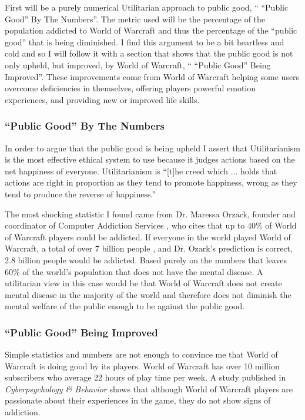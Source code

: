 \documentclass[11pt]{article}
\begin{document}
\begin{multicols}{2}
First will be a purely numerical Utilitarian approach to public good, `` ``Public Good'' By The Numbers''. The metric used will be the percentage of the population addicted to World of Warcraft and thus the percentage of the ``public good'' that is being diminished. I find this argument to be a bit heartless and cold and so I will follow it with a section that shows that the public good is not only upheld, but improved, by World of Warcraft, `` ``Public Good'' Being Improved''. These improvements come from World of Warcraft helping some users overcome deficiencies in themselves, offering players powerful emotion experiences, and providing new or improved life skills.

\subsubsection{``Public Good'' By The Numbers}
In order to argue that the public good is being upheld I assert that Utilitarianism is the most effective ethical system to use because it judges actions based on the net happiness of everyone. Utilitarianism is ``[t]he creed which ... holds that actions are right in proportion as they tend to promote happiness, wrong as they tend to produce the reverse of happiness.'' \cite{Utilitarianism}

The most shocking statistic I found came from Dr. Maressa Orzack, founder and coordinator of Computer Addiction Services \cite{CompAddictionServices}, who cites that up to 40\% of World of Warcraft players could be addicted. \cite{FortyPercentAddicted} If everyone in the world played World of Warcraft, a total of over 7 billion people \cite{WorldPopulation}, and Dr. Ozark's prediction is correct, 2.8 billion people would be addicted. Based purely on the numbers that leaves 60\% of the world's population that does not have the mental disease. A utilitarian view in this case would be that World of Warcraft does not create mental disease in the majority of the world and therefore does not diminish the mental welfare of the public enough to be against the public good.

\subsubsection{``Public Good'' Being Improved}
Simple statistics and numbers are not enough to convince me that World of Warcraft is doing good by its players. World of Warcraft has over 10 million subscribers \cite{WoWPlayerCount} who average 22 hours of play time per week. \cite{PlayerMotivations} A study published in \emph{Cyberpsychology \& Behavior} \cite{ExcessiveUseForSocialAspects} shows that although World of Warcraft players are passionate about their experiences in the game, they do not show signs of addiction.


\end{multicols}
\end{document}
